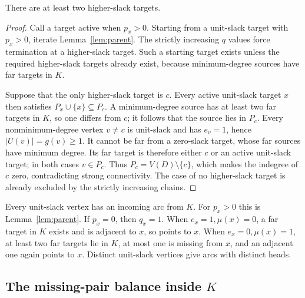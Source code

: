 \begin{lemma}\label{lem:twoheavy}
There are at least two higher-slack targets.
\end{lemma}
\begin{proof}
Call a target active when $p_x>0$.
Starting from a unit-slack target with $p_x>0$, iterate
Lemma~\ref{lem:parent}. The strictly increasing $q$ values force
termination at a higher-slack target.
Such a starting target exists unless the required higher-slack targets
already exist, because minimum-degree sources have far targets in $K$.

Suppose that the only higher-slack target is $c$. Every active
unit-slack target $x$ then satisfies
$P_x\cup\{x\}\subseteq P_c$.
A minimum-degree source has at least two far targets in $K$,
so one differs from $c$; it follows that the source lies in $P_c$.
Every nonminimum-degree vertex $v\ne c$ is unit-slack and has $e_v=1$,
hence $|U(v)|=g(v)\ge1$.
It cannot be far from a zero-slack target, whose far sources have
minimum degree. Its far target is therefore either $c$ or an active
unit-slack target; in both cases $v\in P_c$.
Thus $P_c=V(D)\setminus\{c\}$, which makes the indegree of $c$ zero,
contradicting strong connectivity.
The case of no higher-slack target is already excluded by the
strictly increasing chains.
\end{proof}

Every unit-slack vertex has an incoming arc from $K$.
For $p_x>0$ this is Lemma~\ref{lem:parent}. If $p_x=0$, then $q_x=1$.
When $e_x=1,\mu(x)=0$, a far target in $K$ exists and is adjacent to $x$,
so points to $x$. When $e_x=0,\mu(x)=1$, at least two far targets lie
in $K$, at most one is missing from $x$, and an adjacent one again
points to $x$. Distinct unit-slack vertices give arcs with distinct
heads.

\subsection{The missing-pair balance inside $K$}

